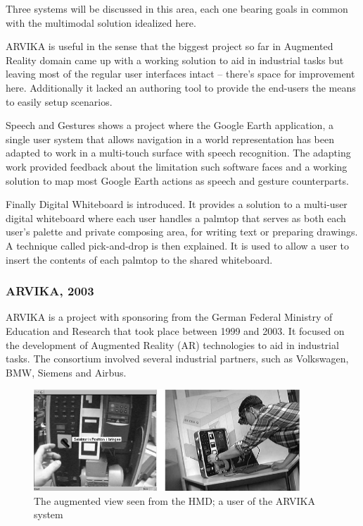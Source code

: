 

Three systems will be discussed in this area, each one bearing goals in common
with the multimodal solution idealized here.

ARVIKA is useful in the sense that the biggest project so far in Augmented Reality
domain came up with a working solution to aid in industrial tasks but leaving most
of the regular user interfaces intact -- there's space for improvement here.
Additionally it lacked an authoring tool to provide the end-users the means to
easily setup scenarios.

Speech and Gestures shows a project where the Google Earth \cite{SITE-EARTH} application, a single
user system that allows navigation in a world representation has been adapted to
work in a multi-touch surface with speech recognition.
The adapting work provided feedback about the limitation such software faces 
and a working solution to map most Google Earth actions as speech and gesture counterparts.

Finally Digital Whiteboard is introduced. It provides a solution to a multi-user digital
whiteboard where each user handles a palmtop that serves as both each user's palette and
private composing area, for writing text or preparing drawings.
A technique called pick-and-drop is then explained. It is used to allow a user to insert
the contents of each palmtop to the shared whiteboard.


\subsubsection{ARVIKA, 2003}

ARVIKA \cite{ARVIKA} is a project with sponsoring from the
German Federal Ministry of Education and Research that took place between 1999 and 2003.
It focused on the development of Augmented Reality (AR) technologies to aid in industrial tasks.
The consortium involved several industrial partners, such as Volkswagen, BMW, Siemens and Airbus.

\begin{figure}[!ht]
    \centering
    \includegraphics[width=10cm]{gfx/arvika.png}
    \caption{The augmented view seen from the HMD; a user of the ARVIKA system}
    \label{FIG-ARVIKA}
\end{figure}

